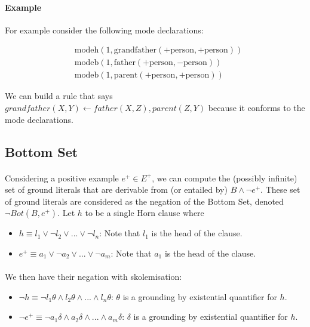 \documentclass{article}
\theoremstyle{plain}
\theoremstyle{definition}
\begin{document}
\begin{multicols}{2}
\paragraph{Example} For example consider the following mode declarations:

\begin{align*}
	&\text{modeh}(1, \text{grandfather}(+\text{person}, +\text{person}))\\
	&\text{modeb}(1, \text{father}(+\text{person}, -\text{person}))\\
	&\text{modeb}(1, \text{parent}(+\text{person}, +\text{person}))
\end{align*}

We can build a rule that says $grandfather(X, Y) \leftarrow father(X, Z), parent(Z, Y)$ because it conforms to the mode declarations.

\subsection{Bottom Set}

\paragraph{} Considering a positive example $e^+ \in E^+$, we can compute the (possibly infinite) set of ground literals that are derivable from (or entailed by) $B \land \lnot e^+$. These set of ground literals are considered as the negation of the Bottom Set, denoted $\lnot Bot(B, e^+)$. Let $h$ to be a single Horn clause where

\begin{itemize}
\item $h \equiv l_1 \lor \lnot l_2 \lor ... \lor \lnot l_n$: Note that $l_1$ is the head of the clause.
\item $e^+ \equiv a_1 \lor \lnot a_2 \lor ... \lor \lnot a_m$: Note that $a_1$ is the head of the clause.
\end{itemize}

\paragraph{} We then have their negation with skolemisation:

\begin{itemize}
\item $\lnot h \equiv \lnot l_1\theta \land l_2\theta \land ... \land l_n\theta$: $\theta$ is a grounding by existential quantifier for $h$.
\item $\lnot e^+ \equiv \lnot a_1\delta \land a_2\delta \land ... \land a_m\delta$: $\delta$ is a grounding by existential quantifier for $h$.
\end{itemize}


\end{multicols}
\end{document}
